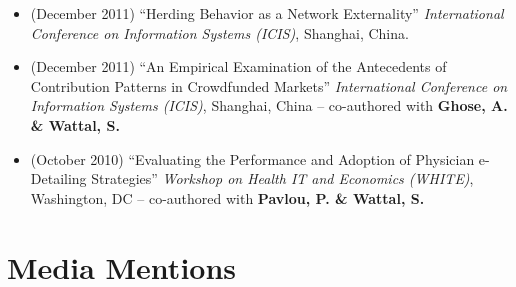 \documentclass[10.5pt,letterpaper,sans]{moderncv}        %
\begin{document}
\begin{itemize}
\item (December 2011) ``Herding Behavior as a Network Externality'' \textit{International Conference on Information Systems (ICIS)}, Shanghai, China.

\item (December 2011) ``An Empirical Examination of the Antecedents of Contribution Patterns in Crowdfunded Markets'' \textit{International Conference on Information Systems (ICIS)}, Shanghai, China -- co-authored with \textbf{Ghose, A. \& Wattal, S.}

\item (October 2010) ``Evaluating the Performance and Adoption of Physician e-Detailing Strategies'' \textit{Workshop on Health IT and Economics (WHITE)}, Washington, DC -- co-authored with \textbf{Pavlou, P. \& Wattal, S.}

\end{itemize}

\section{Media Mentions}
\end{document}
